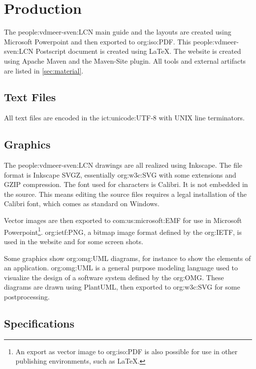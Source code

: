 \section{Production}
\label{sec:production}

    The \ac{people:vdmeer-sven:LCN} main guide and the layouts are created using Microsoft Powerpoint and then exported to \acs{org:iso:PDF}.
    This \ac{people:vdmeer-sven:LCN} Postscript document is created using \LaTeX.
    The website is created using Apache Maven and the Maven-Site plugin.
    All tools and external artifacts are listed in \autoref{sec:material}.


\subsection{Text Files}
    All text files are encoded in the \acs{ict:unicode:UTF}-8 with UNIX line terminators.


\subsection{Graphics}

    The \ac{people:vdmeer-sven:LCN} drawings are all realized using Inkscape.
    The file format is Inkscape SVGZ, essentially \ac{org:w3c:SVG} with some extensions and GZIP compression.
    The font used for characters is Calibri.
    It is not embedded in the source.
    This means editing the source files requires a legal installation of the Calibri font, which comes as standard on Windows.

    Vector images are then exported to \ac{com:us:microsoft:EMF} for use in Microsoft Powerpoint\footnote{An export as vector image to \acs{org:iso:PDF} is also possible for use in other publishing environments, such as \LaTeX.}.
    \ac{org:ietf:PNG}, a bitmap image format defined by the \acs{org:IETF}, is used in the website and for some screen shots.

    Some graphics show \ac{org:omg:UML} diagrams, for instance to show the elements of an application.
    \ac{org:omg:UML} is a general purpose modeling language used to visualize the design of a software system defined by the \acs{org:OMG}.
    These diagrams are drawn using PlantUML, then exported to \ac{org:w3c:SVG} for some postprocessing.


\subsection{Specifications}

